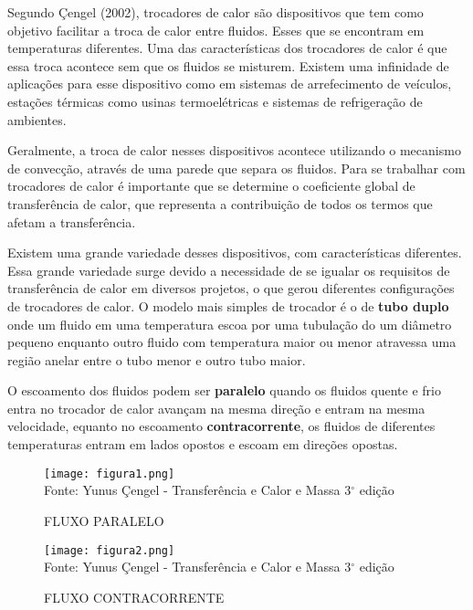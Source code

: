 \documentclass[a4paper,12pt,oneside]{article}
\begin{document}
\begin{flushright}
Segundo Çengel (2002), trocadores de calor são dispositivos que tem como objetivo facilitar a troca de calor entre fluidos. Esses que se encontram em temperaturas diferentes. Uma das características dos trocadores de calor é que essa troca acontece sem que os fluidos se misturem. Existem uma infinidade de aplicações para esse dispositivo como em sistemas de arrefecimento de veículos, estações térmicas como usinas termoelétricas e sistemas de refrigeração de ambientes.

Geralmente, a troca de calor nesses dispositivos acontece utilizando o mecanismo de convecção, através de uma parede que separa os fluidos. Para se trabalhar com trocadores de calor é importante que se determine o coeficiente global de transferência de calor, que representa a contribuição de todos os termos que afetam a transferência.

Existem uma grande variedade desses dispositivos, com características diferentes. Essa grande variedade surge devido a necessidade de se igualar os requisitos de transferência de calor em diversos projetos, o que gerou diferentes configurações de trocadores de calor. O modelo mais simples de trocador é o de \textbf{tubo duplo} onde um fluido em uma temperatura escoa por uma tubulação do um diâmetro pequeno enquanto outro fluido com temperatura maior ou menor atravessa uma região anelar entre o tubo menor e outro tubo maior. 

O escoamento dos fluidos podem ser \textbf{paralelo} quando os fluidos quente e frio entra no trocador de calor avançam na mesma direção e entram na mesma velocidade, equanto no escoamento \textbf{contracorrente}, os fluidos de diferentes temperaturas entram em lados opostos e escoam em direções opostas.

\pagebreak
\clearpage
\newpage


\begin{figure}[h]
	\centering
	\caption{FLUXO PARALELO}
	\vspace{0.5cm}
	\texttt{[image: figura1.png]}
	\vspace{0.5cm}\\
	Fonte: Yunus Çengel - Transferência e Calor e Massa 3$^\circ$ edição
\end{figure}
\vspace{0.5cm}

\begin{figure}[h]
	\centering
	\caption{FLUXO CONTRACORRENTE}
	\vspace{0.5cm}
	\texttt{[image: figura2.png]}
	\vspace{0.5cm}\\
	Fonte: Yunus Çengel - Transferência e Calor e Massa 3$^\circ$ edição
\end{figure}
\vspace{0.5cm}


\end{flushright}
\end{document}
